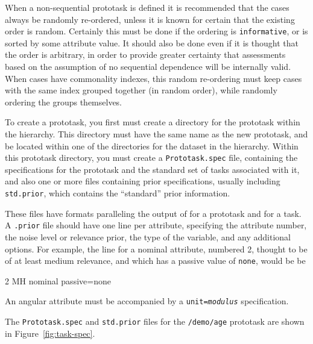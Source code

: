 When a non-sequential prototask is defined it is recommended that the
cases always be randomly re-ordered, unless it is known for certain
that the existing order is random.  Certainly this must be done if the
ordering is \texttt{informative}, or is sorted by some attribute
value.  It should also be done even if it is thought that the order is
arbitrary, in order to provide greater certainty that assessments
based on the assumption of no sequential dependence will be internally
valid. When cases have commonality indexes, this random re-ordering
must keep cases with the same index grouped together (in random
order), while randomly ordering the groups themselves.

To create a prototask, you first must create a directory for the
prototask within the \delve{} hierarchy.  This directory must have the
same name as the new prototask, and be located within one of the
directories for the dataset in the \delve{} hierarchy.  Within this
prototask directory, you must create a \texttt{Prototask.spec} file,
containing the specifications for the prototask and the standard set
of tasks associated with it, and also one or more files containing
prior specifications, usually including \texttt{std.prior}, which
contains the ``standard'' prior information.

These files have formats paralleling the output of \dinfo{} for a
prototask and for a task.  A \texttt{.prior} file should have one line
per attribute, specifying the attribute number, the noise level or
relevance prior, the type of the variable, and any additional options.
For example, the line for a nominal attribute, numbered 2, thought to
be of at least medium relevance, and which has a passive value of
\texttt{none}, would be be\vspace{-5pt} \begin{Session}
  2 MH nominal passive=none
\end{Session}\vspace{-5pt}
An angular attribute must be accompanied by a \texttt{unit={\rm\em modulus}}
specification.

The \texttt{Prototask.spec} and \texttt{std.prior} files for the
\texttt{/demo/age} prototask are shown in Figure~\ref{fig:task-spec}.

